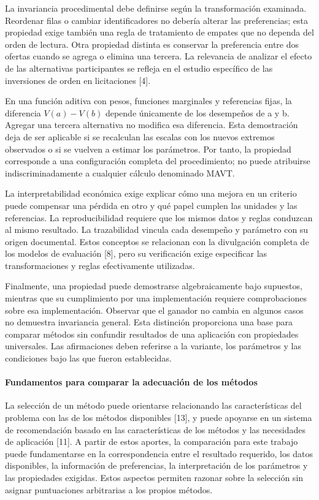 \documentclass[12pt,a4paper]{article}
\begin{document}
La invariancia procedimental debe definirse según la transformación examinada. Reordenar filas o cambiar identificadores no debería alterar las preferencias; esta propiedad exige también una regla de tratamiento de empates que no dependa del orden de lectura. Otra propiedad distinta es conservar la preferencia entre dos ofertas cuando se agrega o elimina una tercera. La relevancia de analizar el efecto de las alternativas participantes se refleja en el estudio específico de las inversiones de orden en licitaciones [4].

En una función aditiva con pesos, funciones marginales y referencias fijas, la diferencia $V(a) - V(b)$ depende únicamente de los desempeños de a y b. Agregar una tercera alternativa no modifica esa diferencia. Esta demostración deja de ser aplicable si se recalculan las escalas con los nuevos extremos observados o si se vuelven a estimar los parámetros. Por tanto, la propiedad corresponde a una configuración completa del procedimiento; no puede atribuirse indiscriminadamente a cualquier cálculo denominado MAVT.

La interpretabilidad económica exige explicar cómo una mejora en un criterio puede compensar una pérdida en otro y qué papel cumplen las unidades y las referencias. La reproducibilidad requiere que los mismos datos y reglas conduzcan al mismo resultado. La trazabilidad vincula cada desempeño y parámetro con su origen documental. Estos conceptos se relacionan con la divulgación completa de los modelos de evaluación [8], pero su verificación exige especificar las transformaciones y reglas efectivamente utilizadas.

Finalmente, una propiedad puede demostrarse algebraicamente bajo supuestos, mientras que su cumplimiento por una implementación requiere comprobaciones sobre esa implementación. Observar que el ganador no cambia en algunos casos no demuestra invariancia general. Esta distinción proporciona una base para comparar métodos sin confundir resultados de una aplicación con propiedades universales. Las afirmaciones deben referirse a la variante, los parámetros y las condiciones bajo las que fueron establecidas.

\paragraph{Fundamentos para comparar la adecuación de los métodos}

La selección de un método puede orientarse relacionando las características del problema con las de los métodos disponibles [13], y puede apoyarse en un sistema de recomendación basado en las características de los métodos y las necesidades de aplicación [11]. A partir de estos aportes, la comparación para este trabajo puede fundamentarse en la correspondencia entre el resultado requerido, los datos disponibles, la información de preferencias, la interpretación de los parámetros y las propiedades exigidas. Estos aspectos permiten razonar sobre la selección sin asignar puntuaciones arbitrarias a los propios métodos.
\end{document}
